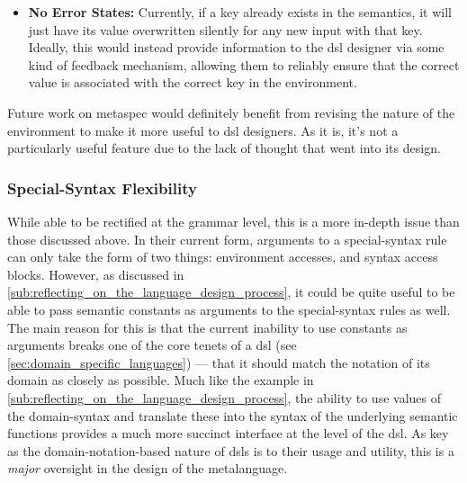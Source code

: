 \begin{itemize}
    While this is not a \textit{particularly onerous} restriction in the context of \glspl{dsl}, it would not impact the semantic correctness of the environment to allow it to work in a scoped fashion.
    Ideally, future revisions of \gls{metaspec} would allow this.
    \item \textbf{No Error States:} Currently, if a key already exists in the semantics, it will just have its value overwritten silently for any new input with that key.
    Ideally, this would instead provide information to the \gls{dsl} designer via some kind of feedback mechanism, allowing them to reliably ensure that the correct value is associated with the correct key in the environment.
\end{itemize}

Future work on \gls{metaspec} would definitely benefit from revising the nature of the environment to make it more useful to \gls{dsl} designers.
As it is, it's not a particularly useful feature due to the lack of thought that went into its design.


\subsubsection{Special-Syntax Flexibility} %
\label{ssub:special_syntax_flexibility}
While able to be rectified at the grammar level, this is a more in-depth issue than those discussed above. 
In their current form, arguments to a special-syntax rule can only take the form of two things: environment accesses, and syntax access blocks. 
However, as discussed in \autoref{sub:reflecting_on_the_language_design_process}, it could be quite useful to be able to pass semantic constants as arguments to the special-syntax rules as well.\\

The main reason for this is that the current inability to use constants as arguments breaks one of the core tenets of a \gls{dsl} (see \autoref{sec:domain_specific_languages}) --- that it should match the notation of its domain as closely as possible.
Much like the example in \autoref{sub:reflecting_on_the_language_design_process}, the ability to use values of the domain-syntax and translate these into the syntax of the underlying semantic functions provides a much more succinct interface at the level of the \gls{dsl}.
As key as the domain-notation-based nature of \glspl{dsl} is to their usage and utility, this is a \textit{major} oversight in the design of the metalanguage.\\

